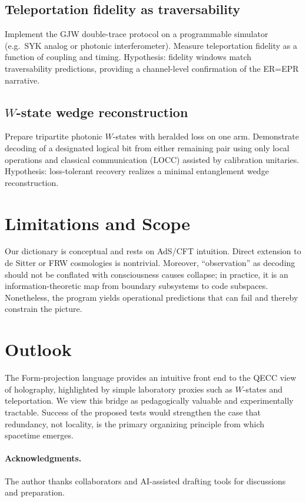 \documentclass[11pt]{article}
\begin{document}
\subsection{Teleportation fidelity as traversability}
Implement the GJW double-trace protocol on a programmable simulator (e.g.\ SYK analog or photonic interferometer). Measure teleportation fidelity as a function of coupling and timing. Hypothesis: fidelity windows match traversability predictions, providing a channel-level confirmation of the ER=EPR narrative.

\subsection{$W$-state wedge reconstruction}
Prepare tripartite photonic $W$-states with heralded loss on one arm. Demonstrate decoding of a designated logical bit from either remaining pair using only local operations and classical communication (LOCC) assisted by calibration unitaries. Hypothesis: loss-tolerant recovery realizes a minimal entanglement wedge reconstruction.

\section{Limitations and Scope}
Our dictionary is conceptual and rests on AdS/CFT intuition. Direct extension to de Sitter or FRW cosmologies is nontrivial. Moreover, ``observation'' as decoding should not be conflated with consciousness causes collapse; in practice, it is an information-theoretic map from boundary subsystems to code subspaces. Nonetheless, the program yields operational predictions that can fail and thereby constrain the picture.

\section{Outlook}
The Form-projection language provides an intuitive front end to the QECC view of holography, highlighted by simple laboratory proxies such as $W$-states and teleportation. We view this bridge as pedagogically valuable and experimentally tractable. Success of the proposed tests would strengthen the case that redundancy, not locality, is the primary organizing principle from which spacetime emerges.

\paragraph{Acknowledgments.} The author thanks collaborators and AI-assisted drafting tools for discussions and preparation.
\end{document}
